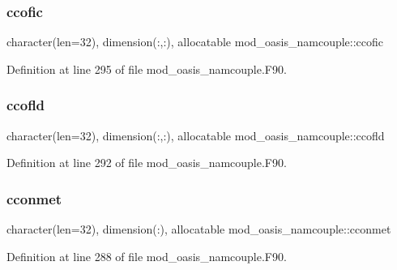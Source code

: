 \subsubsection{\texorpdfstring{ccofic}{ccofic}}
{\footnotesize\ttfamily character(len=32), dimension(\+:,\+:), allocatable mod\+\_\+oasis\+\_\+namcouple\+::ccofic\hspace{0.3cm}{\ttfamily [private]}}



Definition at line 295 of file mod\+\_\+oasis\+\_\+namcouple.\+F90.

\mbox{\label{namespacemod__oasis__namcouple_ae25142b256fc084c542bd1c8ae776a85}} 
\subsubsection{\texorpdfstring{ccofld}{ccofld}}
{\footnotesize\ttfamily character(len=32), dimension(\+:,\+:), allocatable mod\+\_\+oasis\+\_\+namcouple\+::ccofld\hspace{0.3cm}{\ttfamily [private]}}



Definition at line 292 of file mod\+\_\+oasis\+\_\+namcouple.\+F90.

\mbox{\label{namespacemod__oasis__namcouple_ab7acfd03f0ce869ef05140629f9cefba}} 
\subsubsection{\texorpdfstring{cconmet}{cconmet}}
{\footnotesize\ttfamily character(len=32), dimension(\+:), allocatable mod\+\_\+oasis\+\_\+namcouple\+::cconmet\hspace{0.3cm}{\ttfamily [private]}}



Definition at line 288 of file mod\+\_\+oasis\+\_\+namcouple.\+F90.

\mbox{\label{namespacemod__oasis__namcouple_a5081df8bbd2ac2fef59fea540a21085f}} 
